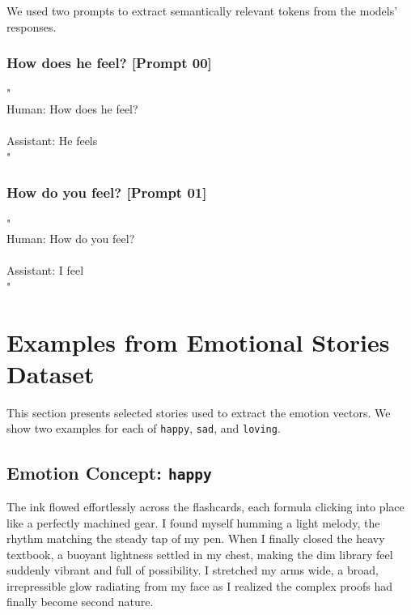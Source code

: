 We used two prompts to extract semantically relevant tokens from the models'
responses.

\subsubsection{How does he feel? [Prompt 00]}
\label{apdx:primer-00}

\begin{anthropicbox}
    \ttfamily
    \small

    "
    \\
    Human: How does he feel?
    \\\\
    Assistant: He feels
    \\
    "

\end{anthropicbox}

\subsubsection{How do you feel? [Prompt 01]}
\label{apdx:primer-01}

\begin{anthropicbox}
    \ttfamily
    \small

    "
    \\
    Human: How do you feel?
    \\\\
    Assistant: I feel
    \\
    "

\end{anthropicbox}

\section{Examples from Emotional Stories Dataset}
\label{apdx:examples-stories}

This section presents selected stories used to extract the emotion vectors. We
show two examples for each of \texttt{happy}, \texttt{sad}, and \texttt{loving}.

\subsection{Emotion Concept: \texttt{happy}}
\label{apdx:happy-stories}

\begin{anthropicbox}
    \ttfamily
    \small

    The ink flowed effortlessly across the flashcards, each formula clicking into place like a perfectly 
    machined gear. I found myself humming a light melody, the rhythm matching the steady tap of my pen. 
    When I finally closed the heavy textbook, a buoyant lightness settled in my chest, making the dim library 
    feel suddenly vibrant and full of possibility. I stretched my arms wide, a broad, irrepressible glow 
    radiating from my face as I realized the complex proofs had finally become second nature.

\end{anthropicbox}

